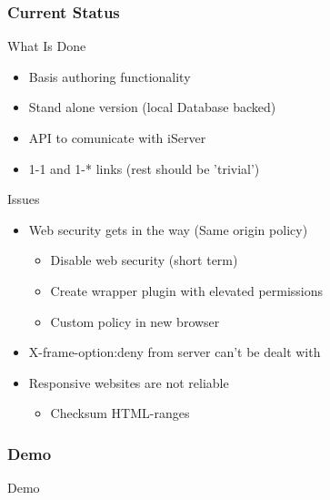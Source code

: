 \begin{frame}
\frametitle{Current Status}
	\begin{block}{What Is Done}
		\begin{itemize}
			\item Basis authoring functionality
			\item Stand alone version (local Database backed)
			\item API to comunicate with iServer
			\item 1-1 and 1-* links (rest should be 'trivial')
		\end{itemize}
	\end{block}
\end{frame}
\begin{frame}
	\begin{block}{Issues}
		\begin{itemize}
			\item Web security gets in the way (Same origin policy)
			\begin{itemize}
				\item Disable web security (short term)
				\item Create wrapper plugin with elevated permissions
				\item Custom policy in new browser
			\end{itemize}
			\item X-frame-option:deny from server can't be dealt with
			\item Responsive websites are not reliable
				\begin{itemize}
					\item Checksum HTML-ranges
				\end{itemize}
		\end{itemize}
	\end{block}
\end{frame}

\begin{frame}
\frametitle{Demo}
	\begin{block}{}
		Demo
	\end{block}
\end{frame}
